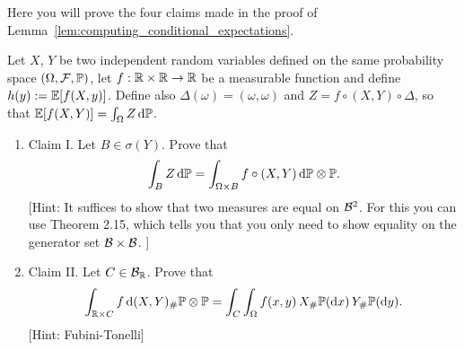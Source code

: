 \begin{problem}\label{prb:computing_conditional_expectations}
Here you will prove the four claims made in the proof of Lemma~\ref{lem:computing_conditional_expectations}.

Let $X$, $Y$ be two independent random variables defined on the same probability space $(\Omega, \mathcal F, \mathbb P)$, let $f : \mathbb R \times \mathbb R \to \mathbb R$ be a measurable function and define $h(y) := \mathbb E[f(X,y)]$. Define also $\Delta(\omega) = (\omega, \omega)$ and $Z = f \circ (X, Y) \circ \Delta$, so that $\mathbb E[f(X,Y)] = \int_\Omega Z \, \mathrm{d} \mathbb P$.

\begin{enumerate}[label={(\alph*)}]
\item Claim I. Let $B \in \sigma(Y)$. Prove that
\[
	\int_{B} Z \, \mathrm{d} \mathbb P = \int_{\Omega \times B} f \circ (X,Y) \, \mathrm{d} \mathbb P \otimes \mathbb P.
\]
[Hint: It suffices to show that two measures are equal on $\mathcal B^2$. For this you can use Theorem 2.15, which tells you that you only need to show equality on the generator set $\mathcal B \times \mathcal B$.
]
\item Claim II. Let $C \in \mathcal B_{\mathbb R}$. Prove that
\[
	\int_{\mathbb R \times C} f \, \mathrm{d} (X,Y)_\# \mathbb P \otimes \mathbb P
	= \int_C \int_\Omega f(x,y) \, X_\#\mathbb P(\mathrm{d} x) \, Y_\# \mathbb P (\mathrm{d} y).
\]
[Hint: Fubini-Tonelli]
\end{enumerate}
\end{problem}


